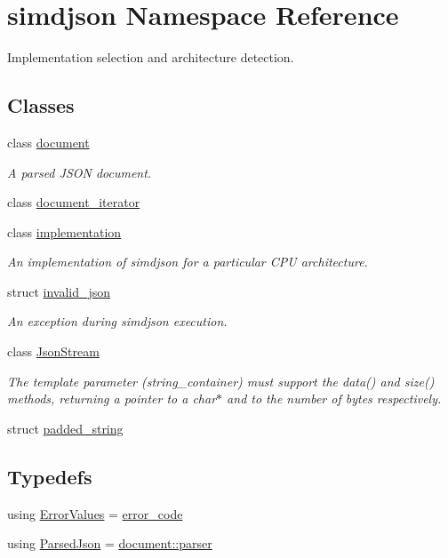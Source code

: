 \hypertarget{namespacesimdjson}{}\section{simdjson Namespace Reference}
\label{namespacesimdjson}


Implementation selection and architecture detection.  


\subsection*{Classes}
\begin{DoxyCompactItemize}
\item 
class \hyperlink{classsimdjson_1_1document}{document}
\begin{DoxyCompactList}\small\item\em A parsed J\+S\+ON document. \end{DoxyCompactList}\item 
class \hyperlink{classsimdjson_1_1document__iterator}{document\+\_\+iterator}
\item 
class \hyperlink{classsimdjson_1_1implementation}{implementation}
\begin{DoxyCompactList}\small\item\em An implementation of simdjson for a particular C\+PU architecture. \end{DoxyCompactList}\item 
struct \hyperlink{structsimdjson_1_1invalid__json}{invalid\+\_\+json}
\begin{DoxyCompactList}\small\item\em An exception during simdjson execution. \end{DoxyCompactList}\item 
class \hyperlink{classsimdjson_1_1_json_stream}{Json\+Stream}
\begin{DoxyCompactList}\small\item\em The template parameter (string\+\_\+container) must support the data() and size() methods, returning a pointer to a char$\ast$ and to the number of bytes respectively. \end{DoxyCompactList}\item 
struct \hyperlink{structsimdjson_1_1padded__string}{padded\+\_\+string}
\end{DoxyCompactItemize}
\subsection*{Typedefs}
\begin{DoxyCompactItemize}
\item 
using \hyperlink{namespacesimdjson_a63b494af834917af13120dcd57719bdb}{Error\+Values} = \hyperlink{namespacesimdjson_a7b735a3a50ba79e3f7f14df5f77d8da9}{error\+\_\+code}
\item 
using \hyperlink{namespacesimdjson_af6e1badb302f3bbaa7eb7465b556de3c}{Parsed\+Json} = \hyperlink{classsimdjson_1_1document_1_1parser}{document\+::parser}
\end{DoxyCompactItemize}
